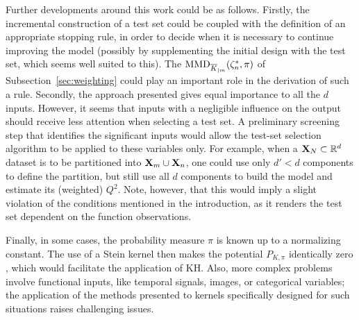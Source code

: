 Further developments around this work could be as follows. 
Firstly, the incremental construction of a test set could be coupled with the definition of an appropriate stopping rule, in order to decide when it is necessary to continue improving the model (possibly by supplementing the initial design with the test set, which seems well suited to this). 
The $\mathrm{MMD}_{\overline{K}_{|m}}(\zeta_n^*,\pi)$ of Subsection~\ref{sec:weighting} could play an important role in the derivation of such a rule. 
Secondly, the approach presented gives equal importance to all the $d$ inputs. 
However, it seems that inputs with a negligible influence on the output should receive less attention when selecting a test set. 
A preliminary screening step that identifies the significant inputs would allow the test-set selection algorithm to be applied to these variables only. 
For example, when a ${\bf X}_N\subset\mathbb{R}^d$ dataset is to be partitioned into ${\bf X}_m\cup{\bf X}_n$, one could use only $d'<d$ components to define the partition, but still use all $d$ components to build the model and estimate its (weighted) $Q^2$. 
Note, however, that this would imply a slight violation of the conditions mentioned in the introduction, as it renders the test set dependent on the function observations. 

Finally, in some cases, the probability measure $\pi$ is known up to a normalizing constant. 
The use of a Stein kernel then makes the potential $P_{K,\pi}$ identically zero \citep{chen_2018_stein_points}, which would facilitate the application of KH. 
Also, more complex problems involve functional inputs, like temporal signals, images, or categorical variables; the application of the methods presented to kernels specifically designed for such situations raises challenging issues. 






